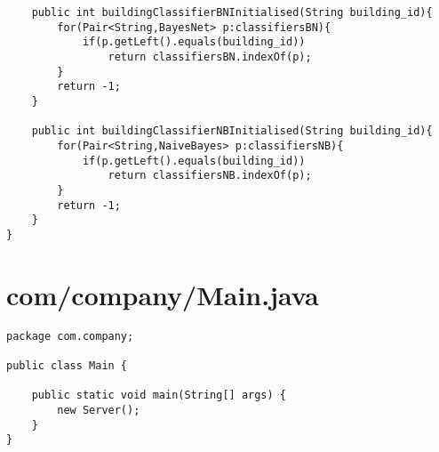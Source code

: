 \documentclass{article}
\begin{document}
\begin{lstlisting}
    public int buildingClassifierBNInitialised(String building_id){
        for(Pair<String,BayesNet> p:classifiersBN){
            if(p.getLeft().equals(building_id))
                return classifiersBN.indexOf(p);
        }
        return -1;
    }

    public int buildingClassifierNBInitialised(String building_id){
        for(Pair<String,NaiveBayes> p:classifiersNB){
            if(p.getLeft().equals(building_id))
                return classifiersNB.indexOf(p);
        }
        return -1;
    }
}
\end{lstlisting}
\newpage
\section{com/company/Main.java}
\begin{lstlisting}package com.company;

public class Main {

    public static void main(String[] args) {
        new Server();
    }
}
\end{lstlisting}
\newpage
\end{document}
